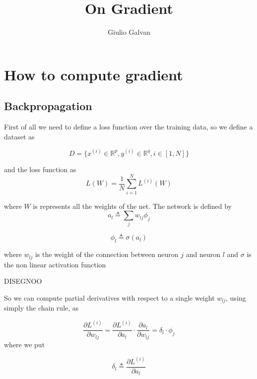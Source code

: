 \documentclass{article}
\title{On Gradient}
\author{Giulio Galvan}
\begin{document}
\maketitle

\begin{abstract}
\end{abstract}

\section{How to compute gradient}
\subsection{Backpropagation}

First of all we need to define a loss function over the training data, so we define a dataset as 

\begin{equation}
D=\{x^{(i)} \in \mathbb{R}^p, y^{(i)} \in \mathbb{R}^q,  i\in[1,N]\}
\end{equation}

and the loss function as
\begin{equation}
L(W)=\frac{1}{N}\sum_{i=1}^N L^{(i)}(W) 
\end{equation}

where $W$ is represents all the weights of the net.
The network is defined by
\begin{equation}
a_l \triangleq \sum_j w_{lj}\phi_j
\end{equation}

\begin{equation}
\phi_l \triangleq \sigma(a_l)
\end{equation}


where $w_{lj}$ is the weight of the connection between neuron $j$ and neuron $l$ and $\sigma$ is the non linear activation function


DISEGNOO

So we can compute partial derivatives with respect to a single weight $w_{lj}$, using simply the chain rule, as 

$$\frac{\partial L^{(i)}}{\partial w_{lj}}=\frac{\partial L^{(i)}}{\partial a_l} \cdot \frac{\partial a_l}{\partial w_{lj}}=\delta_l \cdot \phi_j$$
where we put

\begin{equation}
\delta_l \triangleq \frac{\partial L^{(i)}}{\partial a_l}
\end{equation}
\end{document}
